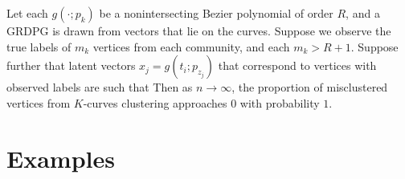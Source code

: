 \documentclass[12pt]{article}
\begin{document}
\begin{theorem}
Let each $g(\cdot; p_k)$ be a nonintersecting Bezier polynomial of order $R$, 
and a GRDPG is drawn from vectors that lie on the curves. 
Suppose we observe the true labels of $m_k$ vertices from each community, and each $m_k > R + 1$. Suppose further that latent vectors $x_j = g(t_i; p_{z_j})$ that correspond to vertices with observed labels are such that 
Then as $n \to \infty$, the proportion of misclustered vertices from $K$-curves clustering approaches $0$ with probability $1$.
\end{theorem}

\hypertarget{examples}{%
\section{Examples}\label{examples}}
\end{document}
